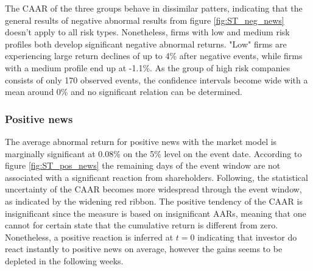 The CAAR of the three groups behave in dissimilar patters, indicating that the general results of negative abnormal results from figure \ref{fig:ST_neg_news} doesn't apply to all risk types.
Nonetheless, firms with low and medium risk profiles both develop significant negative abnormal returns. "Low" firms are experiencing large return declines of up to 4\% after negative events, while firms with a medium profile end up at -1.1\%. As the group of high risk companies consists of only 170 observed events, the confidence intervals become wide with a mean around 0\% and no significant relation can be determined. 



\subsubsection{Positive news}

The average abnormal return for positive news with the market model is marginally significant at 0.08\% on the 5\% level on the event date. According to figure \ref{fig:ST_pos_news} the remaining days of the event window are not associated with a significant reaction from shareholders. Following, the statistical uncertainty of the CAAR becomes more widespread through the event window, as indicated by the widening red ribbon. The positive tendency of the CAAR is insignificant since the measure is based on insignificant AARs, meaning that one cannot for certain state that the cumulative return is different from zero. Nonetheless, a positive reaction is inferred at $t=0$ indicating that investor do react instantly to positive news on average, however the gains seems to be depleted in the following weeks.  

